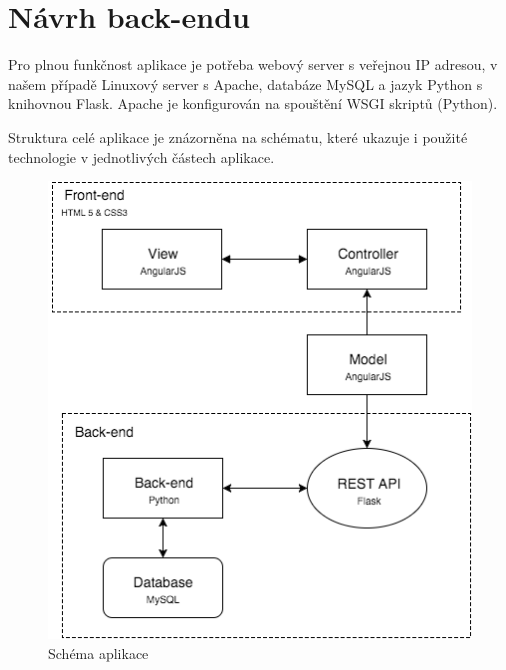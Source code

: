 \documentclass[11pt,a4paper]{article}
\begin{document}
\section*{Návrh back-endu}
Pro plnou funkčnost aplikace je potřeba webový server s veřejnou IP adresou, v našem případě Linuxový server s Apache, databáze MySQL a jazyk Python s knihovnou Flask. Apache je konfigurován na spouštění WSGI skriptů (Python). 

Struktura celé aplikace je znázorněna na schématu, které ukazuje i použité technologie v jednotlivých částech aplikace.
\newline
\newline
\begin{figure}[ht]
\center
\includegraphics[scale=0.5]{schema.png}
\caption{Schéma aplikace}
\end{figure}


\end{document}
